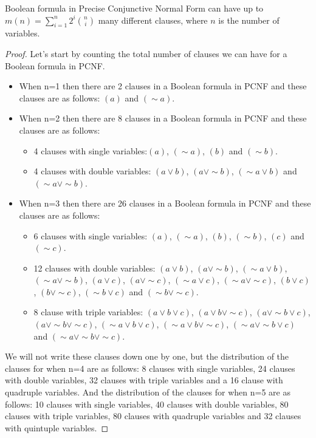 \documentclass[runningheads,a4paper]{llncs}
\let\oldsim\sim
\renewcommand{\sim}{{\oldsim}}
\begin{document}
\begin{theorem}\normalfont

Boolean formula in Precise Conjunctive Normal Form can have up to $ m(n) = \sum_{i=1}^{n} 2^{i} \binom{n} {i}$  many different clauses, where $n$ is the number of variables.
\begin{proof} Let's start by counting the total number of clauses we can have for a Boolean formula in PCNF.
\begin{itemize}
\item When n=1 then there are 2 clauses in a Boolean formula in PCNF and these clauses are as follows: $(a)$ and $(\sim a)$.
 
\item When n=2 then there are 8 clauses in a Boolean formula in PCNF and these clauses are as follows:
     \begin{itemize}
    \item 4 clauses with single variables:$(a)$, $(\sim a)$, $(b)$ and $(\sim b)$.
   \item 4 clauses with double variables: $({a}\vee {b})$, $({a}\vee \sim {b})$, $(\sim {a}\vee {b})$ and $(\sim {a}\vee \sim {b})$.
     \end{itemize}
\item When n=3 then there are 26 clauses in a Boolean formula in PCNF and these clauses are as follows:
    \begin{itemize}
    \item 6 clauses with single variables: $(a)$, $(\sim a)$, $(b)$, $(\sim b)$, $(c)$ and $(\sim c)$.
    \item 12 clauses with double variables: $({a}\vee {b})$, $({a}\vee \sim {b})$, $(\sim {a}\vee {b})$,  $(\sim {a}\vee \sim {b})$, $({a}\vee {c})$, $({a}\vee \sim {c})$, $(\sim {a}\vee {c})$,  $(\sim {a}\vee \sim {c})$, $({b}\vee {c})$, $({b}\vee \sim {c})$, $(\sim {b}\vee {c})$ and $(\sim {b}\vee \sim {c})$.
    \item 8 clause with triple variables: $({a}\vee {b} \vee {c})$, $({a}\vee {b} \vee \sim {c})$, $({a}\vee \sim {b} \vee {c})$, $({a}\vee \sim {b} \vee \sim {c})$, $(\sim {a}\vee {b} \vee {c})$, $(\sim {a}\vee {b} \vee \sim {c})$, $( \sim {a}\vee \sim {b} \vee {c})$ and $( \sim {a}\vee \sim {b} \vee \sim {c})$.
    \end{itemize}
\end{itemize}

We will not write these clauses down one by one, but the distribution of the clauses for when n=4 are as follows:
8 clauses with single variables, 24 clauses with double variables, 32 clauses with triple variables and a 16 clause with quadruple variables. And the distribution of the clauses for when n=5 are as follows: 10 clauses with single variables, 40 clauses with double variables, 80 clauses with triple variables, 80 clauses with quadruple variables and 32 clauses with quintuple variables. 


\end{proof}
\end{theorem}
\end{document}
